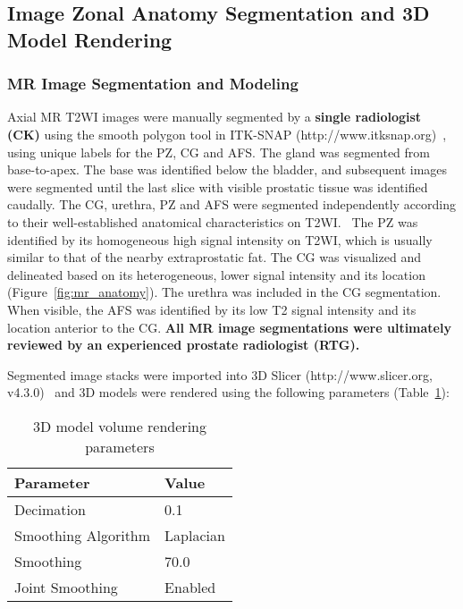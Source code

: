 \subsection{Image Zonal Anatomy Segmentation and 3D Model Rendering}
\subsubsection{MR Image Segmentation and Modeling}
Axial MR T2WI images were manually segmented by a \textbf{single radiologist
    (CK)} using the smooth polygon tool in ITK-SNAP
(http://www.itksnap.org)~\cite{Yushkevich2006}, using unique labels for the PZ,
CG and AFS. The gland was segmented from base-to-apex.  The base was identified
below the bladder, and subsequent images were segmented until the last slice
with visible prostatic tissue was identified caudally. The CG, urethra, PZ and
AFS were segmented independently according to their well-established anatomical
characteristics on
T2WI.~\cite{Barentsz2012,Jung2012,Poon1985,Hricak2007,Bonekamp2011} The PZ was
identified by its homogeneous high signal intensity on T2WI, which is usually
similar to that of the nearby extraprostatic fat. The CG was visualized and
delineated based on its heterogeneous, lower signal intensity and its location
(Figure~\ref{fig:mr_anatomy}). The urethra was included in the CG segmentation.
When visible, the AFS was identified by its low T2 signal intensity and its
location anterior to the CG.  \textbf{All MR image segmentations were
    ultimately reviewed by an experienced prostate radiologist (RTG).}



Segmented image stacks were imported into 3D Slicer (http://www.slicer.org, v4.3.0)~\cite{Fedorov2012} and 3D
models were rendered using the following parameters (Table~\ref{tab:3dslicer}):

\begin{table}[h!]
\centering
\caption{3D model volume rendering parameters}
\begin{tabular}{ll}
{\bf Parameter} & {\bf Value} \\ \hline
Decimation & 0.1 \\
Smoothing Algorithm & Laplacian \\
Smoothing  & 70.0 \\
Joint Smoothing & Enabled \\
\end{tabular}
\label{tab:3dslicer}
\end{table}

